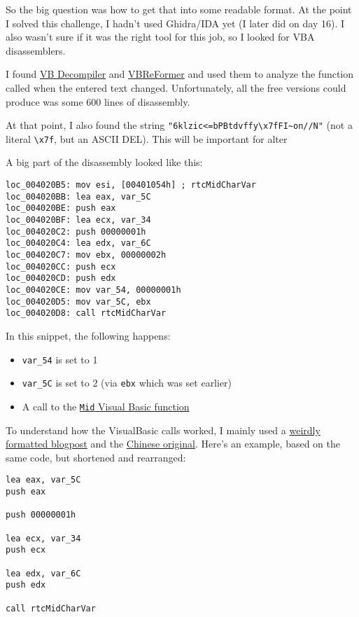 \documentclass[11pt]{article}
\providecommand{\tightlist}{%
      \setlength{\itemsep}{0pt}\setlength{\parskip}{0pt}}
\begin{document}
So the big question was how to get that into some readable format. At
the point I solved this challenge, I hadn't used Ghidra/IDA yet (I later
did on day 16). I also wasn't sure if it was the right tool for this
job, so I looked for VBA disassemblers.

I found \href{https://www.vb-decompiler.org/}{VB Decompiler} and
\href{https://qiil.io/}{VBReFormer} and used them to analyze the
function called when the entered text changed. Unfortunately, all the
free versions could produce was some 600 lines of disassembly.

At that point, I also found the string
\texttt{"6klzic\textless{}=bPBtdvff\textquotesingle{}y\textbackslash{}x7fFI\textasciitilde{}on//N"}
(not a literal \texttt{\textbackslash{}x7f}, but an ASCII DEL). This
will be important for alter

A big part of the disassembly looked like this:

\begin{verbatim}
loc_004020B5: mov esi, [00401054h] ; rtcMidCharVar
loc_004020BB: lea eax, var_5C
loc_004020BE: push eax
loc_004020BF: lea ecx, var_34
loc_004020C2: push 00000001h
loc_004020C4: lea edx, var_6C
loc_004020C7: mov ebx, 00000002h
loc_004020CC: push ecx
loc_004020CD: push edx
loc_004020CE: mov var_54, 00000001h
loc_004020D5: mov var_5C, ebx
loc_004020D8: call rtcMidCharVar
\end{verbatim}

In this snippet, the following happens:

\begin{itemize}
\tightlist
\item
  \texttt{var\_54} is set to 1
\item
  \texttt{var\_5C} is set to 2 (via \texttt{ebx} which was set earlier)
\item
  A call to the
  \href{https://docs.microsoft.com/en-us/office/vba/language/reference/user-interface-help/mid-function}{\texttt{Mid}
  Visual Basic function}
\end{itemize}

To understand how the VisualBasic calls worked, I mainly used a
\href{https://hvoidcode.wordpress.com/2016/02/06/vb-function-description-for-reversing/}{weirdly
formatted blogpost} and the
\href{https://blog.csdn.net/weixin_30736301/article/details/95964460}{Chinese
original}. Here's an example, based on the same code, but shortened and
rearranged:

\begin{verbatim}
lea eax, var_5C
push eax

push 00000001h

lea ecx, var_34
push ecx

lea edx, var_6C
push edx

call rtcMidCharVar
\end{verbatim}
\end{document}
